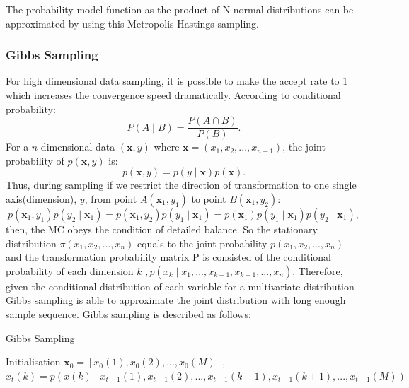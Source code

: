 The probability model function as the product of N normal distributions can be approximated by using this Metropolis-Hastings sampling.
\subsubsection{Gibbs Sampling}
\label{sec:Gibbs}
For high dimensional data sampling, it is possible to make the accept rate to 1 which increases the convergence speed dramatically.
According to conditional probability:
\begin{equation}
P(A \mid B) = \frac{P(A \cap B)}{P(B)}.
\end{equation}
For a $ n $ dimensional data $ (\mathbf{x}, y) $ where $ \mathbf{x}=(x_1,x_2,...,x_{n-1}) $, the joint probability of $p(\mathbf{x},y)$ is:
\begin{equation}
p(\mathbf{x},y) = p(y \mid \mathbf{x})p(\mathbf{x}).
\end{equation}
Thus, during sampling if we restrict the direction of transformation to one single axis(dimension), $ y $, from point $ A(\mathbf{x}_1, y_1) $ to point $ B(\mathbf{x}_1, y_2)$:
\begin{equation}
p(\mathbf{x}_1, y_1)p(y_2 \mid \mathbf{x}_1) = p(\mathbf{x}_1, y_2)p(y_1 \mid \mathbf{x}_1) = p(\mathbf{x}_1)p(y_1 \mid \mathbf{x}_1)p(y_2 \mid \mathbf{x}_1),
\end{equation}
then, the MC obeys the condition of detailed balance.
So the stationary distribution $ \pi(x_1,x_2,...,x_n) $ equals to the joint probability $ p(x_1,x_2,...,x_n) $ and the transformation probability matrix P is consisted of the conditional probability of each dimension $ k $ $,  p(x_k \mid x_1,...,x_{k-1},x_{k+1},...,x_n) $.
Therefore, given the conditional distribution of each variable for a multivariate distribution Gibbs sampling is able to approximate the joint distribution with long enough sample sequence.
Gibbs sampling is described as follows:
\begin{algorithm}[h]
	\caption{Gibbs Sampling}
	\label{alg:gibbs}
	\begin{algorithmic}
		
		\State Initialisation $\mathbf{x}_0 = [x_0(1),x_0(2),...,x_0(M)]$,  
		\State $ x_t(k) = p(x(k) \mid x_{t-1}(1),x_{t-1}(2),...,x_{t-1}(k-1),x_{t-1}(k+1),...,x_{t-1}(M))$\\
		\EndFor
		\EndFor
	\end{algorithmic}
\end{algorithm}

